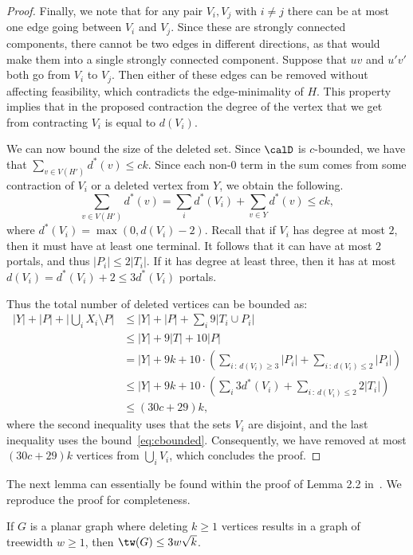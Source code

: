 \begin{proof}
Finally, we note that for any pair $V_i,V_j$ with $i\neq j$ there can be at most one edge going between $V_i$ and $V_j$. Since these are strongly connected components, there cannot be two edges in different directions, as that would make them into a single strongly connected component. Suppose that $uv$ and $u'v'$ both go from $V_i$ to $V_j$. Then either of these edges can be removed without affecting feasibility, which contradicts the edge-minimality of $H$. This property implies that in the proposed contraction the degree of the vertex that we get from contracting $V_i$ is equal to $d(V_i)$.

We can now bound the size of the deleted set. Since $\calD$ is $c$-bounded, we have that $\sum_{v\in V(H')} d^*(v)\leq ck$. Since each non-0 term in the sum comes from some contraction of $V_i$ or a deleted vertex from $Y$, we obtain the following.
\begin{equation}\label{eq:cbounded}
\sum_{v\in V(H')} d^*(v) = \sum_i d^*(V_i) + \sum_{v\in Y} d^*(v)\leq ck,\end{equation}
where $d^*(V_i)=\max(0,d(V_i)-2)$.
Recall that if $V_i$ has degree at most $2$, then it must have at least one terminal. It follows that it can have at most $2$ portals, and thus $|P_i|\leq 2|T_i|$. If it has degree at least three, then it has at most $d(V_i)= d^*(V_i)+2\leq 3d^*(V_i)$ portals.

Thus the total number of deleted vertices can be bounded as:
\begin{align*}
|Y|+|P|+\Big|\bigcup_i X_i\setminus P\Big|&\leq |Y|+|P|+\sum_i 9|T_i\cup P_i|\\
&\leq |Y|+9|T|+10|P|\\
&= |Y|+9k + 10\cdot \left(\sum_{i\,:\,d(V_i)\geq 3} |P_i| + \sum_{i\,:\,d(V_i)\leq 2} |P_i|\right)\\
&\leq |Y| + 9k + 10\cdot \left(\sum_{i} 3d^*(V_i) + \sum_{i\,:\,d(V_i)\leq 2} 2|T_i|\right)\\
&\leq (30c+29)k,
\end{align*}
where the second inequality uses that the sets $V_i$ are disjoint, and the last inequality uses the bound~\eqref{eq:cbounded}.
Consequently, we have removed at most $(30c+29)k$ vertices from $\bigcup_i V_i$, which concludes the proof.
\end{proof}

The next lemma can essentially be found within the proof of Lemma 2.2 in~\cite{ChitnisFHM20}. 
We reproduce the proof for completeness.

\begin{lemma}\label{lem:twboundfromdeletion}
If $G$ is a planar graph where deleting $k\geq 1$ vertices results in a graph of treewidth $w\geq 1$, then $\tw(G)\leq 3w\sqrt{k}$.
\end{lemma}

